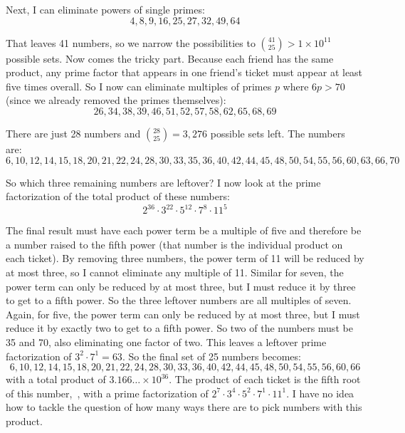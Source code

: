 \documentclass{article}
\begin{document}
Next, I can eliminate powers of single primes:
\begin{equation*}
4,8,9,16,25,27,32,49,64
\end{equation*}

That leaves 41 numbers, so we narrow the possibilities to $\binom{41}{25}> 1\times10^{11}$ possible sets.
Now comes the tricky part.
Because each friend has the same product, any prime factor that appears in one friend's ticket must appear at least five times overall.
So I now can eliminate multiples of primes $p$ where $6p>70$ (since we already removed the primes themselves):
\begin{equation*}
26,34,38,39,46,51,52,57,58,62,65,68,69
\end{equation*}

There are just 28 numbers and $\binom{28}{25}= 3{,}276$ possible sets left.
The numbers are:
\begin{equation*}
6,10,12,14,15,18,20,21,22,24,28,30,33,35,36,40,42,44,45,48,50,54,55,56,60,63,66,70
\end{equation*}

So which three remaining numbers are leftover?
I now look at the prime factorization of the total product of these numbers:
\begin{equation*}
2^{36}\cdot3^{22}\cdot5^{12}\cdot7^{8}\cdot11^{5}
\end{equation*}

The final result must have each power term be a multiple of five and therefore be a number raised to the fifth power (that number is the individual product on each ticket).
By removing three numbers, the power term of 11 will be reduced by at most three, so I cannot eliminate any multiple of 11.
Similar for seven, the power term can only be reduced by at most three, but I must reduce it by three to get to a fifth power.
So the three leftover numbers are all multiples of seven.
Again, for five, the power term can only be reduced by at most three, but I must reduce it by exactly two to get to a fifth power.
So two of the numbers must be 35 and 70, also eliminating one factor of two.
This leaves a leftover prime factorization of $3^{2}\cdot7^{1}=63$.
So the final set of 25 numbers becomes:
\begin{equation*}
6,10,12,14,15,18,20,21,22,24,28,30,33,36,40,42,44,45,48,50,54,55,56,60,66
\end{equation*}
with a total product of $3.166\ldots\times10^{36}$.
The product of each ticket is the fifth root of this number,
\,,
with a prime factorization of $2^{7}\cdot3^{4}\cdot5^{2}\cdot7^{1}\cdot11^{1}$.
I have no idea how to tackle the question of how many ways there are to pick numbers with this product.
\end{document}
